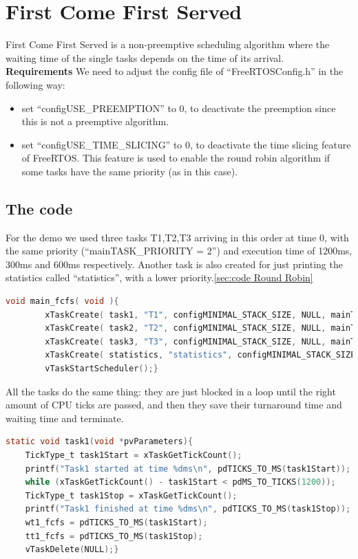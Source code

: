 \documentclass[9pt, reqno]{amsart}
\theoremstyle{definition}
\theoremstyle{remark}
\numberwithin{equation}{section}
\begin{document}
{\section{First Come First Served}
\label{sec:First Come First Served}
First Come First Served is a non-preemptive scheduling algorithm where the waiting time of the single tasks depends on the time of its arrival.\newline
\textbf{Requirements}\newline
We need to adjust the config file of “FreeRTOSConfig.h” in the following way:
\begin{itemize}
    \item set “configUSE\_PREEMPTION” to 0, to deactivate the preemption since this is not a preemptive algorithm.
    \item set “configUSE\_TIME\_SLICING” to 0, to deactivate the time slicing feature of FreeRTOS. This feature is used to enable the round robin algorithm if some tasks have the same priority (as in this case).
\end{itemize}
\subsection{The code}
For the demo we used three tasks T1,T2,T3 arriving in this order at time 0, with the same priority (“mainTASK\_PRIORITY = 2”) and execution time of 1200ms, 300ms and 600ms respectively. 
Another task is also created for just printing the statistics called “statistics”, with a lower priority.\ref{sec:code Round Robin}
\begin{lstlisting}[breaklines=true, basicstyle=\bfseries,language=c,basicstyle=\small]
    void main_fcfs( void ){
		xTaskCreate( task1, "T1", configMINIMAL_STACK_SIZE, NULL, mainTASK_PRIORITY, NULL );
		xTaskCreate( task2, "T2", configMINIMAL_STACK_SIZE, NULL, mainTASK_PRIORITY, NULL );
		xTaskCreate( task3, "T3", configMINIMAL_STACK_SIZE, NULL, mainTASK_PRIORITY, NULL );
		xTaskCreate( statistics, "statistics", configMINIMAL_STACK_SIZE, NULL, mainTASK_PRIORITY-1, NULL );
		vTaskStartScheduler();}
\end{lstlisting} 
All the tasks do the same thing: they are just blocked in a loop until the right amount of CPU ticks are passed, and then they save their turnaround time and waiting time and terminate.
\begin{lstlisting}[breaklines=true, basicstyle=\bfseries,language=c,basicstyle=\small]
static void task1(void *pvParameters){
	TickType_t task1Start = xTaskGetTickCount();
	printf("Task1 started at time %dms\n", pdTICKS_TO_MS(task1Start));
	while (xTaskGetTickCount() - task1Start < pdMS_TO_TICKS(1200));
	TickType_t task1Stop = xTaskGetTickCount();
	printf("Task1 finished at time %dms\n", pdTICKS_TO_MS(task1Stop));
	wt1_fcfs = pdTICKS_TO_MS(task1Start);
	tt1_fcfs = pdTICKS_TO_MS(task1Stop);
	vTaskDelete(NULL);}
\end{lstlisting}
}
\end{document}
